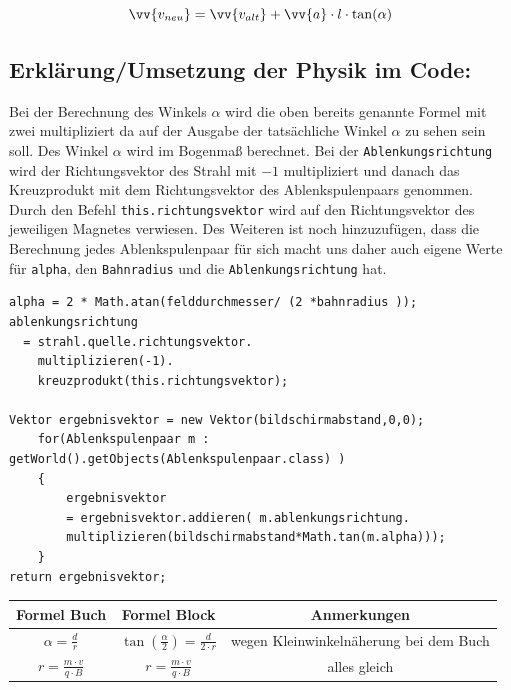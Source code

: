 \begin{equation}
    \label{eq:v}
    \vv{v_{neu}} = \vv{v_{alt}} + \vv{a} \cdot l \cdot \tan(\alpha)
\end{equation}

\subsection{Erklärung/Umsetzung der Physik im Code:}
 Bei der Berechnung des Winkels $\alpha$ wird die oben %
bereits genannte Formel mit zwei multipliziert da auf der Ausgabe der tatsächliche Winkel $\alpha$ zu sehen sein soll. Des Winkel $\alpha$ wird im Bogenmaß berechnet. Bei der \lstinline$Ablenkungsrichtung$ wird der Richtungsvektor des Strahl mit $-1$ multipliziert und danach das Kreuzprodukt mit dem Richtungsvektor des Ablenkspulenpaars genommen. Durch den Befehl \lstinline$this.richtungsvektor$ wird auf den Richtungsvektor des jeweiligen Magnetes verwiesen. Des Weiteren ist noch hinzuzufügen, dass die Berechnung jedes Ablenkspulenpaar für sich macht uns daher auch eigene Werte für \lstinline$alpha$, den \lstinline$Bahnradius$ und die \lstinline$Ablenkungsrichtung$ hat.
\begin{lstlisting}
alpha = 2 * Math.atan(felddurchmesser/ (2 *bahnradius ));
ablenkungsrichtung
  = strahl.quelle.richtungsvektor.
    multiplizieren(-1).
    kreuzprodukt(this.richtungsvektor);

Vektor ergebnisvektor = new Vektor(bildschirmabstand,0,0);
    for(Ablenkspulenpaar m : getWorld().getObjects(Ablenkspulenpaar.class) )
    {
        ergebnisvektor 
        = ergebnisvektor.addieren( m.ablenkungsrichtung.
        multiplizieren(bildschirmabstand*Math.tan(m.alpha)));
    }
return ergebnisvektor;

\end{lstlisting}

\begin{tabular}{c|c|c}
     Formel Buch & Formel Block & Anmerkungen  \\
     \hline
    $\alpha = \frac{d}{r}$ &$\tan(\frac{\alpha}{2}) = \frac{d}{2\cdot r}$& wegen Kleinwinkelnäherung bei dem Buch \\
    \hline
   $r = \frac{m\cdot v}{q\cdot B}$  & $r = \frac{m\cdot v}{q\cdot B}$& alles gleich 
     
\end{tabular}













 
